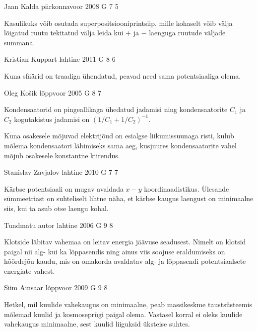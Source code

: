 \documentclass[11pt, twoside]{article}
\begin{document}
{%
{Jaan Kalda} %
{piirkonnavoor} %
{2008} %
{G 7} %
{5} %
{

\ifHint
Kasulikuks võib osutada superpositsiooniprintsiip, mille kohaselt võib välja lõigatud ruutu tekitatud välja leida kui $+$ ja $-$ laenguga ruutude väljade summana.
\fi
}

{Kristian Kuppart} %
{lahtine} %
{2011} %
{G 8} %
{6} %
{

\ifHint
Kuna sfäärid on traadiga ühendatud, peavad need sama potentsiaaliga olema.
\fi
}

{Oleg Košik} %
{lõppvoor} %
{2005} %
{G 8} %
{7} %
{

\ifHint
Kondensaatorid on pingeallikaga ühedatud jadamisi ning kondensaatorite $C_1$ ja $C_2$ kogutakistus jadamisi on $\left( 1/C_1 + 1/C_2 \right) ^{-1}$. 

Kuna osakesele mõjuvad elektrijõud on esialgse liikumissuunaga risti, kulub mõlema kondensaatori läbimiseks sama aeg, kusjuures kondensaatorite vahel mõjub osakesele konstantne kiirendus.
\fi
}

{Stanislav Zavjalov} %
{lahtine} %
{2010} %
{G 7} %
{7} %
{

\ifHint
Kärbse potentsiaali on mugav avaldada $x-y$ koordinaadistikus. Ülesande sümmeetriast on suhteliselt lihtne näha, et kärbse kaugus laengust on minimaalne siis, kui ta asub otse laengu kohal.
\fi
}

{Tundmatu autor} %
{lahtine} %
{2006} %
{G 9} %
{8} %
{

\ifHint
Klotside läbitav vahemaa on leitav energia jäävuse seadusest. Nimelt on klotsid paigal nii alg- kui ka lõppasendis ning ainus viis soojuse eraldumiseks on hõõrdejõu kaudu, mis on omakorda avaldatav alg- ja lõppasendi potentsiaalsete energiate vahest.
\fi
}

{Siim Ainsaar} %
{lõppvoor} %
{2009} %
{G 9} %
{8} %
{

\ifHint
Hetkel, mil kuulide vahekaugus on minimaalne, peab massikeskme taustsüsteemis mõlemad kuulid ja kosmoseprügi paigal olema. Vastasel korral ei oleks kuulide vahekaugus minimaalne, sest kuulid liiguksid üksteise suhtes.
\fi
}

}
\end{document}
